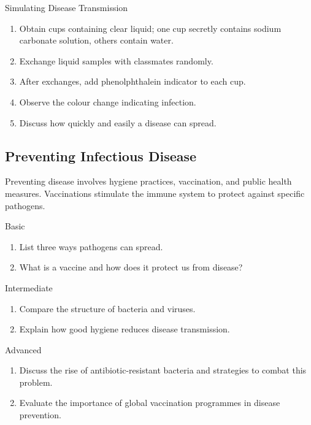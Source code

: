 \begin{investigation}{Simulating Disease Transmission}
\begin{enumerate}
    \item Obtain cups containing clear liquid; one cup secretly contains sodium carbonate solution, others contain water.
    \item Exchange liquid samples with classmates randomly.
    \item After exchanges, add phenolphthalein indicator to each cup.
    \item Observe the colour change indicating infection.
    \item Discuss how quickly and easily a disease can spread.
\end{enumerate}
\end{investigation}

\subsection{Preventing Infectious Disease}

Preventing disease involves hygiene practices, vaccination, and public health measures. Vaccinations stimulate the immune system to protect against specific pathogens.


\begin{tieredquestions}{Basic}
\begin{enumerate}
    \item List three ways pathogens can spread.
    \item What is a vaccine and how does it protect us from disease?
\end{enumerate}
\end{tieredquestions}

\begin{tieredquestions}{Intermediate}
\begin{enumerate}
    \item Compare the structure of bacteria and viruses.
    \item Explain how good hygiene reduces disease transmission.
\end{enumerate}
\end{tieredquestions}

\begin{tieredquestions}{Advanced}
\begin{enumerate}
    \item Discuss the rise of antibiotic-resistant bacteria and strategies to combat this problem.
    \item Evaluate the importance of global vaccination programmes in disease prevention.
\end{enumerate}
\end{tieredquestions}

